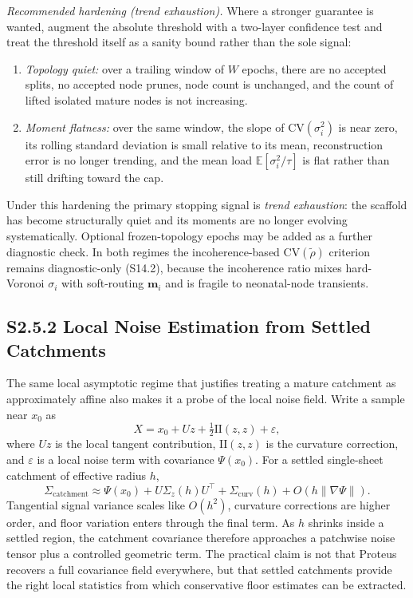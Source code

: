 \documentclass[11pt]{article}
\begin{document}
\emph{Recommended hardening (trend exhaustion).} Where a stronger guarantee is
wanted, augment the absolute threshold with a two-layer confidence test and
treat the threshold itself as a sanity bound rather than the sole signal:
\begin{enumerate}[leftmargin=1.5em]
  \item \emph{Topology quiet:} over a trailing window of $W$ epochs, there are no
  accepted splits, no accepted node prunes, node count is unchanged, and the
  count of lifted isolated mature nodes is not increasing.
  \item \emph{Moment flatness:} over the same window, the slope of
  $\mathrm{CV}(\sigma_i^2)$ is near zero, its rolling standard deviation is
  small relative to its mean, reconstruction error is no longer trending, and
  the mean load $\mathbb E[\sigma_i^2/\tau]$ is flat rather than still drifting
  toward the cap.
\end{enumerate}
Under this hardening the primary stopping signal is \emph{trend exhaustion}: the
scaffold has become structurally quiet and its moments are no longer evolving
systematically. Optional frozen-topology epochs may be added as a further
diagnostic check. In both regimes the incoherence-based
$\mathrm{CV}(\widetilde\rho)$ criterion remains diagnostic-only (S14.2), because
the incoherence ratio mixes hard-Voronoi $\sigma_i$ with soft-routing
$\mathbf m_i$ and is fragile to neonatal-node transients.

\subsection*{S2.5.2 Local Noise Estimation from Settled Catchments}
\label{sec:si-local-noise}
The same local asymptotic regime that justifies treating a mature catchment as
approximately affine also makes it a probe of the local noise field. Write a
sample near $x_0$ as
\[
X=x_0+Uz+\tfrac12\mathrm{II}(z,z)+\varepsilon,
\]
where $Uz$ is the local tangent contribution, $\mathrm{II}(z,z)$ is the
curvature correction, and $\varepsilon$ is a local noise term with covariance
$\Psi(x_0)$. For a settled single-sheet catchment of effective radius $h$,
\[
\Sigma_{\mathrm{catchment}}
\approx
\Psi(x_0)
+
U\Sigma_z(h)U^\top
+
\Sigma_{\mathrm{curv}}(h)
+
O(h\|\nabla\Psi\|).
\]
Tangential signal variance scales like $O(h^2)$, curvature corrections are
higher order, and floor variation enters through the final term. As $h$
shrinks inside a settled region, the catchment covariance therefore approaches a
patchwise noise tensor plus a controlled geometric term. The practical claim is
not that Proteus recovers a full covariance field everywhere, but that settled
catchments provide the right local statistics from which conservative floor
estimates can be extracted.
\end{document}
